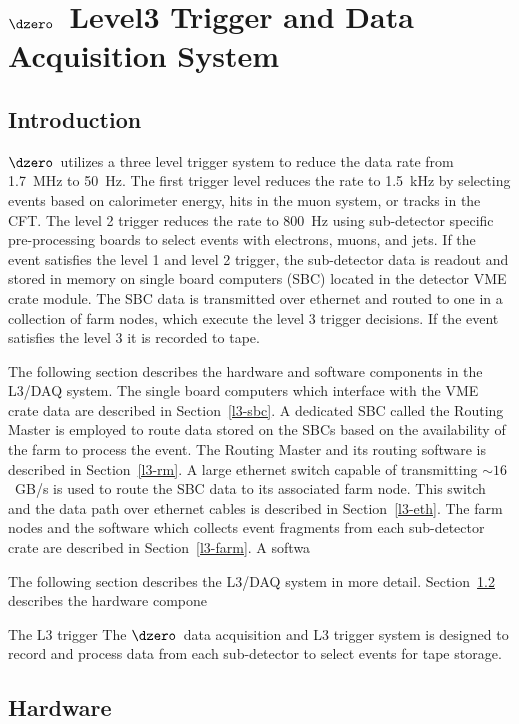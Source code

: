 \chapter{$\dzero$~Level3 Trigger and Data Acquisition System}
\label{Level3}

\section{Introduction}

$\dzero$~utilizes a three level trigger system to reduce the data rate from 1.7~MHz to 50~Hz. The first trigger level reduces the rate to 1.5~kHz by selecting events based on calorimeter energy, hits in the muon system, or tracks in the CFT. The level 2 trigger reduces the rate to 800~Hz using sub-detector specific pre-processing boards to select events with electrons, muons, and jets. If the event satisfies the level 1 and level 2 trigger, the sub-detector data is readout and stored in memory on single board computers (SBC) located in the detector VME crate module. The SBC data is transmitted over ethernet and routed to one in a collection of farm nodes, which execute the level 3 trigger decisions. If the event satisfies the level 3 it is recorded to tape. 

The following section describes the hardware and software components in the L3/DAQ system. The single board computers which interface with the VME crate data are described in Section~\ref{l3-sbc}. A dedicated SBC called the Routing Master is employed to route data stored on the SBCs based on the availability of the farm to process the event. The Routing Master and its routing software is described in Section~\ref{l3-rm}. A large ethernet switch capable of transmitting $\sim16$~GB/s is used to route the SBC data to its associated farm node. This switch and the data path over ethernet cables is described in Section~\ref{l3-eth}. The farm nodes and the software which collects event fragments from each sub-detector crate are described in Section~\ref{l3-farm}. A softwa

The following section describes the L3/DAQ system in more detail. Section~\ref{l3-hardware} describes the hardware compone

The L3 trigger 
The $\dzero$~data acquisition and L3 trigger system is designed to record and process data from each sub-detector to select events for tape storage.

\section{Hardware}
\label{l3-hardware}

